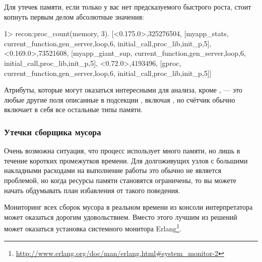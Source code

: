 Для утечек памяти, если только у вас нет предсказуемого быстрого роста, стоит копнуть первым делом абсолютные значения:

\begin{VerbatimEshell}
1> recon:proc_count(memory, 3).
[{<0.175.0>,325276504,
  [myapp_stats,
   {current_function,{gen_server,loop,6}},
   {initial_call,{proc_lib,init_p,5}}]},
 {<0.169.0>,73521608,
  [myapp_giant_sup,
   {current_function,{gen_server,loop,6}},
   {initial_call,{proc_lib,init_p,5}}]},
 {<0.72.0>,4193496,
  [gproc,
   {current_function,{gen_server,loop,6}},
   {initial_call,{proc_lib,init_p,5}}]}]
\end{VerbatimEshell}

Атрибуты, которые могут оказаться интересными для анализа, кроме , --- это любые другие поля описанные в подсекции , включая , но счётчик  обычно включает в себя все остальные типы памяти.


\subsubsection{Утечки сборщика мусора}
\label{subsubsec:leak-gc}

Очень возможна ситуация, что процесс использует много памяти, но лишь в течение коротких промежутков времени. Для долгоживущих узлов с большими накладными расходами на выполнение работы это обычно не является проблемой, но когда ресурсы памяти становятся ограничены, то вы можете начать обдумывать план избавления от такого поведения.

Мониторинг всех сборок мусора в реальном времени из консоли интерпретатора может оказаться дорогим удовольствием. Вместо этого лучшим из решений может оказаться установка системного монитора Erlang\footnote{\href{http://www.erlang.org/doc/man/erlang.html\#system\_monitor-2}{http://www.erlang.org/doc/man/erlang.html\#system\_monitor-2}}.

